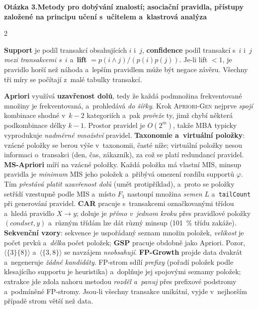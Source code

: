 \documentclass[10pt,a4paper]{article}
\newcommand{\qpage}[2]{%
  \begin{qbox}{}
  \textbf{\large Otázka #1.}\quad\textbf{#2}
  \end{qbox}
  \vspace{-0.3em}}
\newcommand{\hh}[1]{\par\smallskip\noindent{\bfseries\color{headcol}#1}\par\nobreak\vspace{-0.2em}}
\newcommand{\tm}[1]{\textbf{#1}}
\begin{document}
\qpage{3}{Metody pro dobývání znalostí; asociační pravidla, přístupy založené na principu
učení s~učitelem a~klastrová analýza}
\begin{multicols}{2}
\footnotesize

\hh{Asociační pravidla --- míry}
\tm{Support} je podíl transakcí obsahujících $i$ i~$j$, \tm{confidence} podíl transakcí
s~$i$ i~$j$ \emph{mezi transakcemi s~$i$} a~\tm{lift} $=p(i\wedge j)/(p(i)p(j))$.
Je-li lift $<1$, je pravidlo horší než náhoda a~lepším pravidlem může být negace závěru.
Všechny tři míry se počítají z~malé tabulky transakcí.

\hh{Apriori a~varianty}
\tm{Apriori} využívá \tm{uzavřenost dolů}, tedy že každá podmnožina frekventované množiny je
frekventovaná, a~prohledává \emph{do šířky}. Krok \textsc{Apriori-Gen} nejprve \emph{spojí}
kombinace shodné v~$k-2$ kategoriích a~pak \emph{prořeže} ty, jimž chybí některá podkombinace
délky $k-1$. Prostor pravidel je $O(2^m)$, takže MBA typicky vyprodukuje \emph{nadměrné
množství} pravidel.
\tm{Taxonomie a~virtuální položky}: vzácné položky se berou výše v~taxonomii, časté níže;
virtuální položky nesou informaci o~transakci (den, čas, zákazník), za což se platí redundancí
pravidel.
\tm{MS-Apriori} míří na vzácné položky. Každá položka má vlastní $\mathrm{MIS}$, minsup
pravidla je \emph{minimum} MIS jeho položek a~přibývá omezení rozdílu supportů $\varphi$.
Tím \emph{přestává platit uzavřenost dolů} (umět protipříklad), a~proto se položky setřídí
vzestupně podle MIS a~místo $F_1$ nastoupí množina \emph{semen} $L$ a~\texttt{tailCount}
při generování pravidel.
\tm{CAR} pracuje s~transakcemi označkovanými třídou a~hledá pravidlo $X\to y$; doluje je
\emph{přímo v~jednom kroku} přes pravidlové položky $(\mathit{condset},y)$ a~různým třídám lze
dát různý minsup (101~\% třídu zakáže).
\tm{Sekvenční vzory}: sekvence je uspořádaný seznam množin položek, \emph{velikost} je počet
prvků a~\emph{délka} počet položek; \tm{GSP} pracuje obdobně jako Apriori. Pozor,
$\langle\{3\}\{8\}\rangle$ a~$\langle\{3,8\}\rangle$ se navzájem \emph{neobsahují}.
\tm{FP-Growth} projde data dvakrát a~negeneruje \emph{žádné kandidáty}. FP-strom sdílí
\emph{prefixy} (pořadí položek podle klesajícího supportu je heuristika) a~doplňuje jej
spojovými seznamy položek; extrakce jde zdola nahoru metodou \emph{rozděl a~panuj} přes
prefixové podstromy a~podmíněné FP-stromy. Jsou-li všechny transakce unikátní, vyjde
v~nejhorším případě strom větší než data.


\end{multicols}
\end{document}
